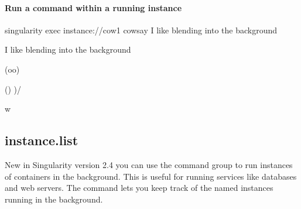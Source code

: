 \documentclass[letterpaper,10pt,english]{sphinxmanual}
\begin{document}
\paragraph{Run a command within a running instance}
\label{\detokenize{appendix:run-a-command-within-a-running-instance}}
%
\begin{sphinxVerbatim}[commandchars=\\\{\}]
\PYGZdl{} singularity exec instance://cow1 cowsay \PYGZdq{}I like blending into the background\PYGZdq{}

 \PYGZus{}\PYGZus{}\PYGZus{}\PYGZus{}\PYGZus{}\PYGZus{}\PYGZus{}\PYGZus{}\PYGZus{}\PYGZus{}\PYGZus{}\PYGZus{}\PYGZus{}\PYGZus{}\PYGZus{}\PYGZus{}\PYGZus{}\PYGZus{}\PYGZus{}\PYGZus{}\PYGZus{}\PYGZus{}\PYGZus{}\PYGZus{}\PYGZus{}\PYGZus{}\PYGZus{}\PYGZus{}\PYGZus{}\PYGZus{}\PYGZus{}\PYGZus{}\PYGZus{}\PYGZus{}\PYGZus{}\PYGZus{}\PYGZus{}

\PYGZlt{} I like blending into the background \PYGZgt{}

 \PYGZhy{}\PYGZhy{}\PYGZhy{}\PYGZhy{}\PYGZhy{}\PYGZhy{}\PYGZhy{}\PYGZhy{}\PYGZhy{}\PYGZhy{}\PYGZhy{}\PYGZhy{}\PYGZhy{}\PYGZhy{}\PYGZhy{}\PYGZhy{}\PYGZhy{}\PYGZhy{}\PYGZhy{}\PYGZhy{}\PYGZhy{}\PYGZhy{}\PYGZhy{}\PYGZhy{}\PYGZhy{}\PYGZhy{}\PYGZhy{}\PYGZhy{}\PYGZhy{}\PYGZhy{}\PYGZhy{}\PYGZhy{}\PYGZhy{}\PYGZhy{}\PYGZhy{}\PYGZhy{}\PYGZhy{}

        \PYGZbs{}   \PYGZca{}\PYGZus{}\PYGZus{}\PYGZca{}

         \PYGZbs{}  (oo)\PYGZbs{}\PYGZus{}\PYGZus{}\PYGZus{}\PYGZus{}\PYGZus{}\PYGZus{}\PYGZus{}

            (\PYGZus{}\PYGZus{})\PYGZbs{}       )\PYGZbs{}/\PYGZbs{}

                \textbar{}\textbar{}\PYGZhy{}\PYGZhy{}\PYGZhy{}\PYGZhy{}w \textbar{}

                \textbar{}\textbar{}     \textbar{}\textbar{}
\end{sphinxVerbatim}


\subsection{instance.list}
\label{\detokenize{appendix:instance-list}}\label{\detokenize{appendix:id46}}
New in Singularity version 2.4 you can use the  command group to run
instances of containers in the background. This is useful for running
services like databases and web servers. The  command lets you keep track
of the named instances running in the background.
\end{document}
